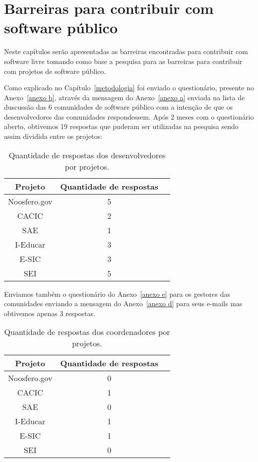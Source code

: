 \chapter{Barreiras para contribuir com software público}

Neste capítulos serão apresentadas as barreiras encontradas para contribuir com
software livre tomando como base a pesquisa para as barreiras para contribuir com
projetos de software público.

Como explicado no Capítulo~\ref{metodologia} foi enviado o questionário, 
presente no Anexo~\ref{anexo b}, através da mensagem do Anexo~\ref{anexo a} 
enviada na lista de duscussão das 6 comunidades de software público com 
a intenção de que os desenvolvedores das comunidades respondessem. Após 2 
meses com o questionário aberto, obtivemos 19 respostas que puderam ser 
utilizadas na pesquisa sendo assim dividida entre os projetos:

\begin{table}[h]
	\centering
	\label{tab01}
	
	\begin{tabular}{ccc}
		\toprule
		\textbf{Projeto} & \textbf{Quantidade de respostas} \\
		\midrule
		Noosfero.gov & 5 \\
		CACIC & 2 \\
		SAE & 1 \\
		I-Educar & 3 \\
		E-SIC & 3 \\
		SEI & 5 \\
		\bottomrule
	\end{tabular}

	\caption{Quantidade de respostas dos desenvolvedores por projetos.}
\end{table}
  

Enviamos também o questionário do Anexo~\ref{anexo e} para os gestores das 
comunidades enviando a mensagem do Anexo~\ref{anexo d} para seus e-mails mas 
obtivemos apenas 3 respostas.

\begin{table}[h]
	\centering
	\label{tab01}
	
	\begin{tabular}{ccc}
		\toprule
		\textbf{Projeto} & \textbf{Quantidade de respostas} \\
		\midrule
		Noosfero.gov & 0 \\
		CACIC & 1 \\
		SAE & 0 \\
		I-Educar & 1 \\
		E-SIC & 1 \\
		SEI & 0 \\
		\bottomrule
	\end{tabular}

	\caption{Quantidade de respostas dos coordenadores por projetos.}
\end{table}



